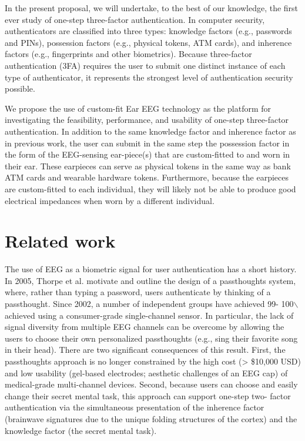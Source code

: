 \documentclass[11pt]{article}
\begin{document}
In the present proposal, we will undertake, to the best of our knowledge, the first
ever study of one-step three-factor authentication. In computer security,
authenticators are classified into three types: knowledge factors (e.g., passwords
and PINs), possession factors (e.g., physical tokens, ATM cards), and inherence
factors (e.g., fingerprints and other biometrics). Because three-factor
authentication (3FA) requires the user to submit one distinct instance of each
type of authenticator, it represents the strongest level of authentication security
possible.

We propose the use of custom-fit Ear EEG technology as the platform for
investigating the feasibility, performance, and usability of one-step three-factor
authentication. In addition to the same knowledge factor and inherence factor as
in previous work, the user can submit in the same step the possession factor
in the form of the EEG-sensing ear-piece(s) that are custom-fitted to and worn in
their ear. These earpieces can serve as physical tokens in the same way as bank
ATM cards and wearable hardware tokens. Furthermore, because the earpieces
are custom-fitted to each individual, they will likely not be able to produce good
electrical impedances when worn by a different individual.

\section{Related work}
\label{sec:org3732d7c}

The use of EEG as a biometric signal for user authentication has a short history.
In 2005, Thorpe et al. motivate and outline the design of a passthoughts system,
where, rather than typing a password, users authenticate 
by thinking of a passthought. Since 2002, a number of independent groups have achieved 99-
100$\backslash$%
achieved using a consumer-grade single-channel sensor. In particular, the
lack of signal diversity from multiple EEG channels can be overcome by allowing
the users to choose their own personalized passthoughts (e.g., sing their favorite
song in their head). There are two significant consequences of this result. First,
the passthoughts approach is no longer constrained by the high cost (> \$10,000 USD)
and low usability (gel-based electrodes; aesthetic challenges of an EEG cap) of
medical-grade multi-channel devices. Second, because users can choose and
easily change their secret mental task, this approach can support one-step two-
factor authentication via the simultaneous presentation of the inherence factor
(brainwave signatures due to the unique folding structures of the cortex) and the
knowledge factor (the secret mental task).
\end{document}
